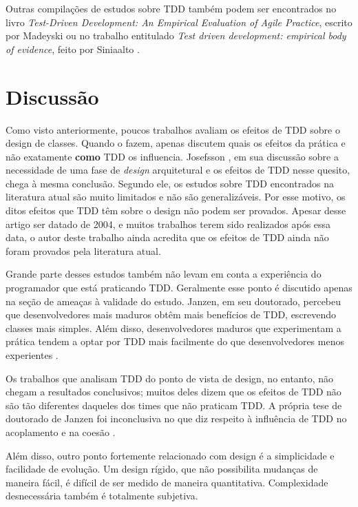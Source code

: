 Outras compilações de estudos sobre TDD também podem ser encontrados no livro
\textit{Test-Driven Development: An Empirical Evaluation of Agile Practice},
escrito por Madeyski \cite{madeyski-livro} ou no trabalho entitulado
\textit{Test driven development: empirical body of evidence}, feito por
Siniaalto \cite{tdd-body-of-evidence}.

\section{Discussão}

Como visto anteriormente, poucos trabalhos avaliam os efeitos de TDD sobre o
design de classes. Quando o fazem, apenas discutem quais os efeitos da prática
e não exatamente \textbf{como} TDD os influencia. Josefsson
\cite{josefsson}, em sua discussão sobre a necessidade de uma fase de \textit{design}
arquitetural e os efeitos de TDD nesse quesito, chega à mesma conclusão. Segundo
ele, os estudos sobre TDD encontrados na literatura atual são muito limitados e
não são generalizáveis. Por esse motivo, os ditos efeitos que TDD têm 
sobre o design não podem ser provados. Apesar desse artigo ser datado de 2004, e
muitos trabalhos terem sido realizados após essa data, o autor deste trabalho ainda acredita 
que os efeitos de TDD ainda não foram provados pela literatura atual.

Grande parte desses estudos também não levam em conta a experiência do
programador que está praticando TDD. Geralmente esse ponto é discutido apenas 
na seção de ameaças à validade do estudo. Janzen, em seu doutorado, percebeu que
desenvolvedores mais maduros obtêm mais benefícios de TDD, escrevendo classes
mais simples. Além disso, desenvolvedores maduros que experimentam a prática
tendem a optar por TDD mais facilmente do que desenvolvedores menos experientes
\cite{janzen-phd}.

Os trabalhos que analisam TDD do ponto de vista de design, no entanto, não
chegam a resultados conclusivos; muitos deles dizem que os efeitos
de TDD não são tão diferentes daqueles dos times que não praticam TDD.  A própria tese de
doutorado de Janzen foi inconclusiva no que diz respeito à influência de TDD no 
acoplamento e na coesão \cite{janzen-phd}. 

Além disso, outro ponto fortemente relacionado com design é a simplicidade e
facilidade de evolução. Um design rígido, que não possibilita mudanças de maneira
fácil, é difícil de ser medido de maneira quantitativa. Complexidade
desnecessária também é totalmente subjetiva. 


